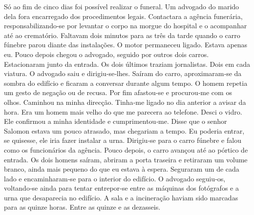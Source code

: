 Só ao fim de cinco dias foi possível realizar o funeral. Um advogado do
marido dela fora encarregado dos procedimentos legais. Contactara a
agência funerária, responsabilizando­‑se por levantar o corpo na morgue
do hospital e o acompanhar até ao crematório. Faltavam dois minutos para
as três da tarde quando o carro fúnebre parou diante das instalações. O
motor permaneceu ligado. Estava apenas eu. Pouco depois chegou o
advogado, seguido por outros dois carros. Estacionaram junto da entrada.
Os dois últimos traziam jornalistas. Dois em cada viatura. O advogado
saiu e dirigiu­‑se­‑lhes. Saíram do carro, aproximaram­‑se da sombra do
edifício e ficaram a conversar durante algum tempo. O homem repetia um
gesto de negação ou de recusa. Por fim afastou­‑se e procurou­‑me com os
olhos. Caminhou na minha direcção. Tinha­‑me ligado no dia anterior a
avisar da hora. Era um homem mais velho do que me parecera ao telefone.
Desci o vidro. Ele confirmou a minha identidade e cumprimentou­‑me.
Disse que o senhor Salomon estava um pouco atrasado, mas chegariam a
tempo. Eu poderia entrar, se quisesse, ele iria fazer instalar a urna.
Dirigiu­‑se para o carro fúnebre e falou como os funcionários da
agência. Pouco depois, o carro avançou até ao pórtico de entrada. Os
dois homens saíram, abriram a porta traseira e retiraram um volume
branco, ainda mais pequeno do que eu estava à espera. Seguraram um de
cada lado e encaminharam­‑se para o interior do edifício. O advogado
seguiu­‑os, voltando­‑se ainda para tentar entrepor­‑se entre as
máquinas dos fotógrafos e a urna que desaparecia no edifício. A sala e a
incineração haviam sido marcadas para as quinze horas. Entre as quinze e
as dezasseis.

